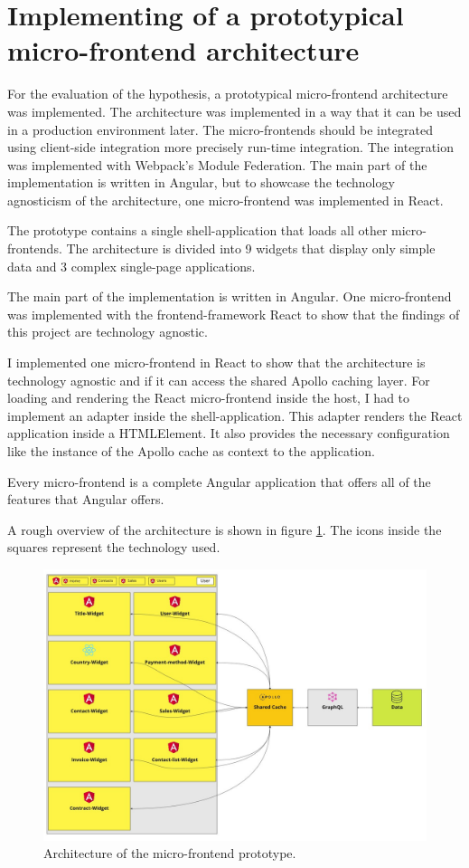 \section{Implementing of a prototypical micro-frontend architecture}

For the evaluation of the hypothesis, a prototypical micro-frontend architecture was implemented. The architecture was implemented in a way that it can be used in a production environment later. The micro-frontends should be integrated using client-side integration more precisely run-time integration. The integration was implemented with Webpack's Module Federation. The main part of the implementation is written in Angular, but to showcase the technology agnosticism of the architecture, one micro-frontend was implemented in React.

The prototype contains a single shell-application that loads all other micro-frontends. The architecture is divided into 9 widgets that display only simple data and 3 complex single-page applications. 

The main part of the implementation is written in Angular. One micro-frontend was implemented with the frontend-framework React to show that the findings of this project are technology agnostic.

I implemented one micro-frontend in React to show that the architecture is technology agnostic and if it can access the shared Apollo caching layer. For loading and rendering the React micro-frontend inside the host, I had to implement an adapter inside the shell-application. This adapter renders the React application inside a HTMLElement. It also provides the necessary configuration like the instance of the Apollo cache as context to the application.

Every micro-frontend is a complete Angular application that offers all of the features that Angular offers.

A rough overview of the architecture is shown in figure \ref{figure:methods:ui-dashboard-architecture}. The icons inside the squares represent the technology used.

\ifshowImages
\begin{figure}[H]
\centering
\includegraphics[width=0.8\linewidth]{images/ui-dashboard-architecture.jpeg}
\caption{Architecture of the micro-frontend prototype.}\label{figure:methods:ui-dashboard-architecture}
\end{figure}
\fi

